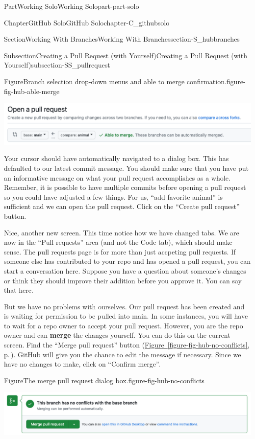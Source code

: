 \documentclass[twoside,10pt,]{book}
\newcommand{\xreffont}{\relax}
\newcommand{\terminology}[1]{\textbf{#1}}
\begin{document}
\begin{partptx}{Part}{Working Solo}{}{Working Solo}{}{}{part-part-solo}
\begin{chapterptx}{Chapter}{GitHub Solo}{}{GitHub Solo}{}{}{chapter-C_githubsolo}
\begin{sectionptx}{Section}{Working With Branches}{}{Working With Branches}{}{}{section-S_hubbranches}
\begin{subsectionptx}{Subsection}{Creating a Pull Request (with Yourself)}{}{Creating a Pull Request (with Yourself)}{}{}{subsection-SS_pullrequest}
\begin{figureptx}{Figure}{Branch selection drop-down menus and able to merge confirmation.}{figure-fig-hub-able-merge}{}
\begin{image}{0.1}{0.8}{0.1}{}%
\includegraphics[width=\linewidth]{external/hub_able_merge.pdf}
\end{image}%
\tcblower
\end{figureptx}%
Your cursor should have automatically navigated to a dialog box. This has defaulted to our latest commit message. You should make sure that you have put an informative message on what your pull request accomplishes as a whole. Remember, it is possible to have multiple commits before opening a pull request so you could have adjusted a few things. For us, ``add favorite animal'' is sufficient and we can open the pull request. Click on the ``Create pull request'' button.%
\par
Nice, another new screen. This time notice how we have changed tabs. We are now in the ``Pull requests'' area (and not the Code tab), which should make sense. The pull requests page is for more than just accpeting pull requests. If someone else has contributed to your repo and has opened a pull request, you can start a conversation here. Suppose you have a question about someone's changes or think they should improve their addition before you approve it. You can say that here.%
\par
But we have no problems with ourselves. Our pull request has been created and is waiting for permission to be pulled into main. In some instances, you will have to wait for a repo owner to accept your pull request. However, you are the repo owner and can \terminology{merge} the changes yourself. You can do this on the current screen. Find the ``Merge pull request'' button (\hyperref[figure-fig-hub-no-conflicts]{Figure~{\xreffont\ref{figure-fig-hub-no-conflicts}}, p.\,\pageref{figure-fig-hub-no-conflicts}}). GitHub will give you the chance to edit the message if necessary. Since we have no changes to make, click on ``Confirm merge''.%
\begin{figureptx}{Figure}{The merge pull request dialog box.}{figure-fig-hub-no-conflicts}{}%
\begin{image}{0.05}{0.9}{0.05}{}%
\includegraphics[width=\linewidth]{external/hub_no_conflicts.pdf}

\end{image}
\end{figureptx}
\end{subsectionptx}
\end{sectionptx}
\end{chapterptx}
\end{partptx}
\end{document}
